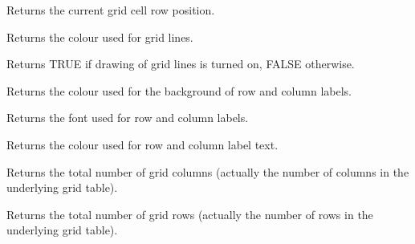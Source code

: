 \label{wxgridgetgridcursorrow}


Returns the current grid cell row position.

\label{wxgridgetgridlinecolour}


Returns the colour used for grid lines.

\label{wxgridgridlinesenabled}


Returns TRUE if drawing of grid lines is turned on, FALSE otherwise.

\label{wxgridgetlabelbackgroundcolour}


Returns the colour used for the background of row and column labels.

\label{wxgridgetlabelfont}


Returns the font used for row and column labels.

\label{wxgridgetlabeltextcolour}


Returns the colour used for row and column label text.

\label{wxgridgetnumbercols}


Returns the total number of grid columns (actually the number of columns in the underlying grid
table).

\label{wxgridgetnumberrows}


Returns the total number of grid rows (actually the number of rows in the underlying grid table).

\label{wxgridgetrowlabelalignment}


